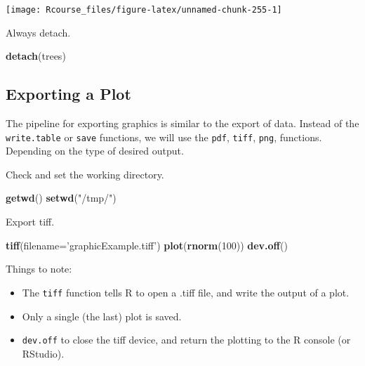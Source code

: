 \documentclass[]{book}
\newenvironment{Shaded}{\begin{snugshade}}{\end{snugshade}}
\newcommand{\DataTypeTok}[1]{\textcolor[rgb]{0.13,0.29,0.53}{#1}}
\newcommand{\DecValTok}[1]{\textcolor[rgb]{0.00,0.00,0.81}{#1}}
\newcommand{\KeywordTok}[1]{\textcolor[rgb]{0.13,0.29,0.53}{\textbf{#1}}}
\newcommand{\NormalTok}[1]{#1}
\newcommand{\StringTok}[1]{\textcolor[rgb]{0.31,0.60,0.02}{#1}}
\providecommand{\tightlist}{%
  \setlength{\itemsep}{0pt}\setlength{\parskip}{0pt}}
\theoremstyle{definition}
\theoremstyle{definition}
\theoremstyle{definition}
\theoremstyle{remark}
\begin{document}
\texttt{[image: Rcourse\_files/figure-latex/unnamed-chunk-255-1]}

Always detach.

\begin{Shaded}
\begin{Highlighting}[]
\KeywordTok{detach}\NormalTok{(trees)}
\end{Highlighting}
\end{Shaded}

\hypertarget{exporting-a-plot}{%
\subsection{Exporting a Plot}\label{exporting-a-plot}}

The pipeline for exporting graphics is similar to the export of data.
Instead of the \texttt{write.table} or \texttt{save} functions, we will use the \texttt{pdf}, \texttt{tiff}, \texttt{png}, functions. Depending on the type of desired output.

Check and set the working directory.

\begin{Shaded}
\begin{Highlighting}[]
\KeywordTok{getwd}\NormalTok{()}
\KeywordTok{setwd}\NormalTok{(}\StringTok{"/tmp/"}\NormalTok{)}
\end{Highlighting}
\end{Shaded}

Export tiff.

\begin{Shaded}
\begin{Highlighting}[]
\KeywordTok{tiff}\NormalTok{(}\DataTypeTok{filename=}\StringTok{'graphicExample.tiff'}\NormalTok{)}
\KeywordTok{plot}\NormalTok{(}\KeywordTok{rnorm}\NormalTok{(}\DecValTok{100}\NormalTok{))}
\KeywordTok{dev.off}\NormalTok{()}
\end{Highlighting}
\end{Shaded}

Things to note:

\begin{itemize}
\tightlist
\item
  The \texttt{tiff} function tells R to open a .tiff file, and write the output of a plot.
\item
  Only a single (the last) plot is saved.
\item
  \texttt{dev.off} to close the tiff device, and return the plotting to the R console (or RStudio).
\end{itemize}
\end{document}
